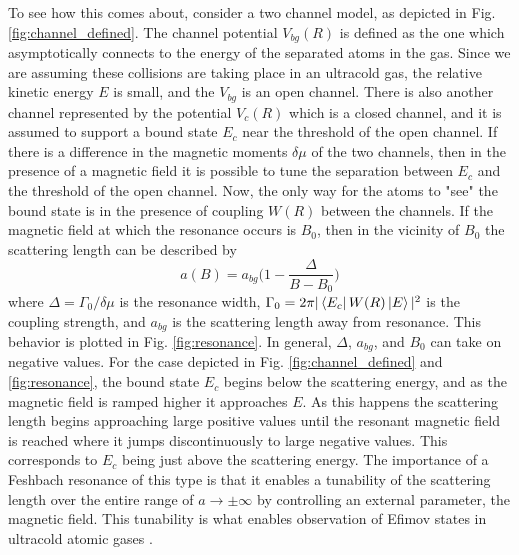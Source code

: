 \documentclass[prl,onecolumn,amsmath,amssymb,titlepage,nofootinbib,preprint]{revtex4-1}
\begin{document}
	To see how this comes about, consider a two channel model, as depicted in Fig. \ref{fig:channel_defined}.  The channel potential $V_{bg}(R)$ is defined as the one which asymptotically connects to the energy of the separated atoms in the gas.  Since we are assuming these collisions are taking place in an ultracold gas, the relative kinetic energy $E$ is small, and the $V_{bg}$ is an open channel.  There is also another channel represented by the potential $V_{c}(R)$ which is a closed channel, and it is assumed to support a bound state $E_{c}$ near the threshold of the open channel.  If there is a difference in the magnetic moments $\delta\mu$ of the two channels, then in the presence of a magnetic field it is possible to tune the separation between $E_{c}$ and the threshold of the open channel.  Now, the only way for the atoms to "see" the bound state is in the presence of coupling $W(R)$ between the channels.  If the magnetic field at which the resonance occurs is $B_{0}$, then in the vicinity of $B_{0}$ the scattering length can be described by
	\begin{equation}\label{eq:a(b)}
		a(B)=a_{bg}\bigg(1-\frac{\Delta}{B-B_{0}}\bigg)
	\end{equation}
	where $\Delta=\Gamma_{0}/\delta\mu$ is the resonance width, $\Gamma_{0}=2\pi|\bra{E_{c}}W(R)\ket{E}|^{2}$ is the coupling strength, and $a_{bg}$ is the scattering length away from resonance.  This behavior is plotted in Fig. \ref{fig:resonance}.  In general, $\Delta$, $a_{bg}$, and $B_{0}$ can take on negative values.  For the case depicted in Fig. \ref{fig:channel_defined} and \ref{fig:resonance}, the bound state  $E_{c}$ begins below the scattering energy, and as the magnetic field is ramped higher it approaches $E$.  As this happens the scattering length begins approaching large positive values until the resonant magnetic field is reached where it jumps discontinuously  to large negative values.  This corresponds to $E_{c}$ being just above the scattering energy.  The importance of a Feshbach resonance of this type is that it enables a tunability of the scattering length over the entire range of $a\rightarrow\pm\infty$ by controlling an external parameter, the magnetic field.  This tunability is what enables observation of Efimov states in ultracold atomic gases \cite{Kraemer2006_1st_observ}\cite{Huang2014}.
	
\end{document}
